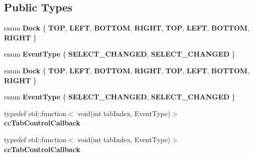 \subsection*{Public Types}
\begin{DoxyCompactItemize}
\item 
\mbox{\label{classui_1_1TabControl_a8f69ef830a0a523b1f867f8e01d17e1d}} 
enum {\bfseries Dock} \{ \newline
{\bfseries T\+OP}, 
{\bfseries L\+E\+FT}, 
{\bfseries B\+O\+T\+T\+OM}, 
{\bfseries R\+I\+G\+HT}, 
\newline
{\bfseries T\+OP}, 
{\bfseries L\+E\+FT}, 
{\bfseries B\+O\+T\+T\+OM}, 
{\bfseries R\+I\+G\+HT}
 \}
\item 
\mbox{\label{classui_1_1TabControl_ad1f67023ae14e5d192412ad2dc297fd9}} 
enum {\bfseries Event\+Type} \{ {\bfseries S\+E\+L\+E\+C\+T\+\_\+\+C\+H\+A\+N\+G\+ED}, 
{\bfseries S\+E\+L\+E\+C\+T\+\_\+\+C\+H\+A\+N\+G\+ED}
 \}
\item 
\mbox{\label{classui_1_1TabControl_a8f69ef830a0a523b1f867f8e01d17e1d}} 
enum {\bfseries Dock} \{ \newline
{\bfseries T\+OP}, 
{\bfseries L\+E\+FT}, 
{\bfseries B\+O\+T\+T\+OM}, 
{\bfseries R\+I\+G\+HT}, 
\newline
{\bfseries T\+OP}, 
{\bfseries L\+E\+FT}, 
{\bfseries B\+O\+T\+T\+OM}, 
{\bfseries R\+I\+G\+HT}
 \}
\item 
\mbox{\label{classui_1_1TabControl_ad1f67023ae14e5d192412ad2dc297fd9}} 
enum {\bfseries Event\+Type} \{ {\bfseries S\+E\+L\+E\+C\+T\+\_\+\+C\+H\+A\+N\+G\+ED}, 
{\bfseries S\+E\+L\+E\+C\+T\+\_\+\+C\+H\+A\+N\+G\+ED}
 \}
\item 
\mbox{\label{classui_1_1TabControl_a46b6b0dad83c8bdd8c5086f7ba47e6c1}} 
typedef std\+::function$<$ void(int tab\+Index, Event\+Type)$>$ {\bfseries cc\+Tab\+Control\+Callback}
\item 
\mbox{\label{classui_1_1TabControl_a46b6b0dad83c8bdd8c5086f7ba47e6c1}} 
typedef std\+::function$<$ void(int tab\+Index, Event\+Type)$>$ {\bfseries cc\+Tab\+Control\+Callback}
\end{DoxyCompactItemize}
